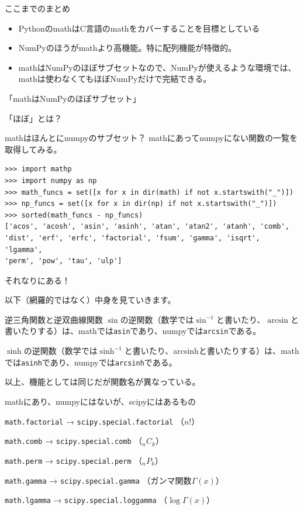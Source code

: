 \documentclass[unicode,lualatex,aspectratio=169]{beamer}
\begin{document}
\begin{frame}[fragile]{ここまでのまとめ}
  \begin{itemize}
  \item PythonのmathはC言語のmathをカバーすることを目標としている
  \item NumPyのほうがmathより高機能。特に配列機能が特徴的。
  \item mathはNumPyのほぼサブセットなので、NumPyが使えるような環境では、mathは使わなくてもほぼNumPyだけで完結できる。
  \end{itemize}
\end{frame}
\begin{frame}
  「mathはNumPyのほぼサブセット」

  
  「ほぼ」とは？
\end{frame}
\begin{frame}[fragile]{mathはほんとにnumpyのサブセット？}
mathにあってnumpyにない関数の一覧を取得してみる。
{\fontsize{6pt}{6pt}\selectfont    
\begin{verbatim}
>>> import mathp
>>> import numpy as np
>>> math_funcs = set([x for x in dir(math) if not x.startswith("_")])
>>> np_funcs = set([x for x in dir(np) if not x.startswith("_")])
>>> sorted(math_funcs - np_funcs)
['acos', 'acosh', 'asin', 'asinh', 'atan', 'atan2', 'atanh', 'comb', 
'dist', 'erf', 'erfc', 'factorial', 'fsum', 'gamma', 'isqrt', 'lgamma',
'perm', 'pow', 'tau', 'ulp']
\end{verbatim}
}
それなりにある！

以下（網羅的ではなく）中身を見ていきます。
\end{frame}
\begin{frame}[fragile]{逆三角関数と逆双曲線関数}
  $\sin$の逆関数（数学では$\sin^{-1}$と書いたり、$\arcsin$と書いたりする）は、mathでは\verb|asin|であり、numpyでは\verb|arcsin|である。

  
  $\sinh$の逆関数（数学では$\sinh^{-1}$と書いたり、arcsinhと書いたりする）は、mathでは\verb|asinh|であり、numpyでは\verb|arcsinh|である。

  以上、機能としては同じだが関数名が異なっている。
\end{frame}
\begin{frame}[fragile]{mathにあり、numpyにはないが、scipyにはあるもの}
  
  \verb|math.factorial| → \verb|scipy.special.factorial| （$n!$）
  
  \verb|math.comb| → \verb|scipy.special.comb| （${}_n C_k$）
  
  \verb|math.perm| → \verb|scipy.special.perm| （${}_n P_k$）

  \verb|math.gamma| → \verb|scipy.special.gamma| （ガンマ関数$\Gamma(x)$）
  
  \verb|math.lgamma| → \verb|scipy.special.loggamma| （$\log \Gamma(x)$）
\end{frame}
\end{document}
